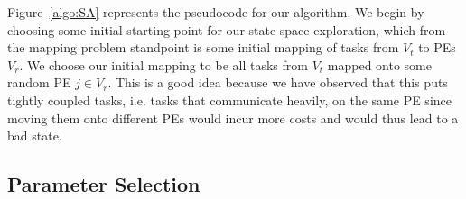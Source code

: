 Figure~\ref{algo:SA} represents the pseudocode for our algorithm. We
begin by choosing some initial starting point for our state space
exploration, which from the mapping problem standpoint is some initial
mapping of tasks from $V_t$ to PEs $V_r$. We choose our initial mapping
to be all tasks from $V_t$ mapped onto some random PE $j \in V_r$. This
is a good idea because we have observed that this puts tightly coupled
tasks, i.e. tasks that communicate heavily, on the same PE since moving
them onto different PEs would incur more costs and would thus lead to a
bad state.

\subsection{Parameter Selection}


